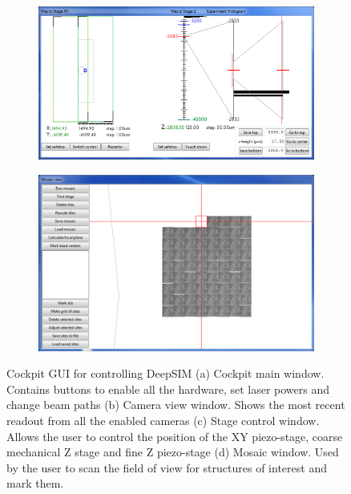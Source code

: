 \begin{figure}[h]
	\begin{subfigure}{0.51\textwidth}
		\centering
		\includegraphics[width=\linewidth]{images/DeepSIM_control_software_stage_control.png}
		\caption{}
		\label{fig:DeepSIM_control_software_stage_control}
	\end{subfigure}
	\begin{subfigure}{0.45\textwidth}
		\centering
		\includegraphics[width=\linewidth]{images/DeepSIM_control_software_mosaic.png}
		\caption{}
		\label{fig:DeepSIM_control_software_mosaic}
	\end{subfigure}
	\caption{Cockpit GUI for controlling DeepSIM (a) Cockpit main window. Contains buttons to enable all the hardware, set laser powers and change beam paths (b) Camera view window. Shows the most recent readout from all the enabled cameras (c) Stage control window. Allows the user to control the position of the XY piezo-stage, coarse mechanical Z stage and fine Z piezo-stage (d) Mosaic window. Used by the user to scan the field of view for structures of interest and mark them.}
	\label{fig:Cockpit_UI}
\end{figure}

